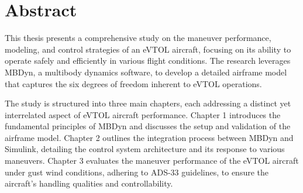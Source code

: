 \documentclass{Configuration_Files/PoliMi3i_thesis}
\begin{document}


\frontmatter %


\startpreamble
\setcounter{page}{1} %

\chapter*{Abstract} 
This thesis presents a comprehensive study on the maneuver performance, modeling, and control strategies of an eVTOL aircraft, focusing on its ability to operate safely and efficiently in various flight conditions. The research leverages MBDyn, a multibody dynamics software, to develop a detailed airframe model that captures the six degrees of freedom inherent to eVTOL operations. 

The study is structured into three main chapters, each addressing a distinct yet interrelated aspect of eVTOL aircraft performance. Chapter 1 introduces the fundamental principles of MBDyn and discusses the setup and validation of the airframe model. Chapter 2 outlines the integration process between MBDyn and Simulink, detailing the control system architecture and its response to various maneuvers. Chapter 3 evaluates the maneuver performance of the eVTOL aircraft under gust wind conditions, adhering to ADS-33 guidelines, to ensure the aircraft's handling qualities and controllability.
\end{document}
